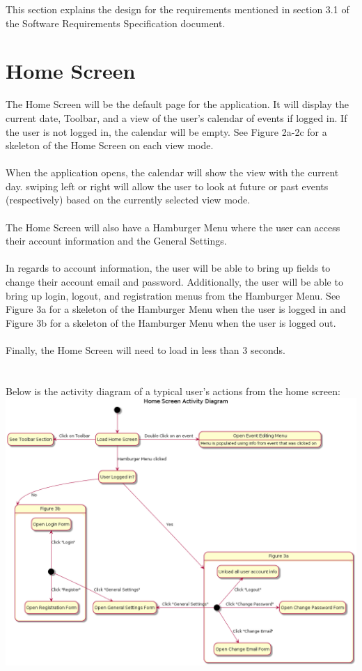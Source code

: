 \documentclass{scrreprt}
\begin{document}
This section explains the design for the requirements mentioned in section 3.1 of the Software Requirements Specification document.

\section{Home Screen}

The Home Screen will be the default page for the application.  It will display the current date, Toolbar, and a view of the user's calendar of events if logged in.  If the user is not logged in, the calendar will be empty. See Figure 2a-2c for a skeleton of the Home Screen on each view mode.\\
\\
When the application opens, the calendar will show the view with the current day.  swiping left or right will allow the user to look at future or past events (respectively) based on the currently selected view mode.\\
\\
The Home Screen will also have a Hamburger Menu where the user can access their account information and the General Settings.\\
\\
In regards to account information, the user will be able to bring up fields to change their account email and password.  Additionally, the user will be able to bring up login, logout, and registration menus from the Hamburger Menu.  See Figure 3a for a skeleton of the Hamburger Menu when the user is logged in and Figure 3b for a skeleton of the Hamburger Menu when the user is logged out.\\
\\
Finally, the Home Screen will need to load in less than 3 seconds. \\
\\
\\
Below is the activity diagram of a typical user's actions from the home screen:\\
\includegraphics[width=\textwidth]{homescreen.png}
\end{document}
